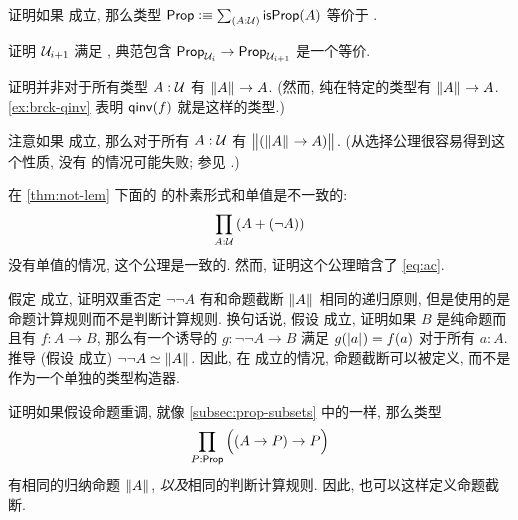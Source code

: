 \begin{ex}
    \label{ex:lem-impl-prop-equiv-bool}
    证明如果 \LEM{} 成立, 那么类型 $\prop \defeq \sm{A:\type} \isprop(A)$ 等价于 \bool.
\end{ex}

\begin{ex}
    \label{ex:lem-impred}
    证明 $\mathcal{U}_{i+1}$ 满足 \LEM{}, 典范包含 $\mathsf{Prop}_{\mathcal{U}_i} \to \mathsf{Prop}_{\mathcal{U}_{i+1}}$ 是一个等价.
\end{ex}

\begin{ex}
    \label{ex:not-brck-A-impl-A}
    证明并非对于所有类型 $A:\mathcal{U}$ 有 $\mathopen{}\left\Vert A\right\Vert_{}\mathclose{} \to A$.
    (然而, 纯在特定的类型有 $\mathopen{}\left\Vert A\right\Vert_{}\mathclose{}\to A$.
    \cref{ex:brck-qinv} 表明 $\mathsf{qinv}(f)$ 就是这样的类型.)
\end{ex}

\begin{ex}
    \label{ex:lem-impl-simple-ac}
    注意如果 \LEM{} 成立, 那么对于所有 $A:\mathcal{U}$ 有 $\bigl\Vert (\mathopen{}\left\Vert A\right\Vert_{}\mathclose{} \to A)\bigr\Vert_{}$.
    (从选择公理很容易得到这个性质, 没有 \LEM{} 的情况可能失败;
    参见 \cite{krausgeneralizations}.)
\end{ex}

\begin{ex}
    \label{ex:naive-lem-impl-ac}
    在 \cref{thm:not-lem} 下面的 \LEM{} 的朴素形式和单值是不一致的:
    \[ \prd{A:\type} (A+(\neg A)) \]
    没有单值的情况, 这个公理是一致的.
    然而, 证明这个公理暗含了 \eqref{eq:ac}.
\end{ex}

\begin{ex}
    \label{ex:lem-brck}
    假定 \LEM{} 成立, 证明双重否定 $\neg \neg A$ 有和命题截断 $\mathopen{}\left\Vert A\right\Vert_{}\mathclose{}$ 相同的递归原则, 但是使用的是命题计算规则而不是判断计算规则.
    换句话说, 假设 \LEM{} 成立, 证明如果 $B$ 是纯命题而且有 $f:A\to B$, 那么有一个诱导的 $g:\neg\neg A \to B$ 满足 $g(\mathopen{}\left|a\right|_{}^{}\mathclose{}) = f(a)$ 对于所有 $a:A$.
    推导 (假设 \LEM{} 成立) $\neg\neg A \simeq \mathopen{}\left\Vert A\right\Vert_{}\mathclose{}$.
    因此, 在 \LEM{} 成立的情况, 命题截断可以被定义, 而不是作为一个单独的类型构造器.
\end{ex}

\begin{ex}
    \label{ex:impred-brck}
    证明如果假设命题重调, 就像 \cref{subsec:prop-subsets} 中的一样, 那么类型
    \[\prd{P:\prop} \Parens{(A\to P)\to P}\]
    有相同的归纳命题 $\mathopen{}\left\Vert A\right\Vert_{}\mathclose{}$, \emph{以及}相同的判断计算规则.
    因此, 也可以这样定义命题截断.
\end{ex}

